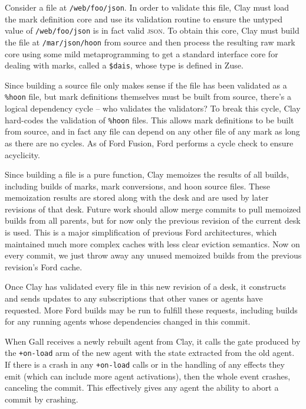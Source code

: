 \documentclass[twoside]{article}
\begin{document}
Consider a file at \lstinline[style=inlinecode]{/web/foo/json}. In order to validate this file, Clay must load the mark definition core and use its validation routine to ensure the untyped value of \lstinline[style=inlinecode]{/web/foo/json} is in fact valid \textsc{json}. To obtain this core, Clay must build the file at \lstinline[style=inlinecode]{/mar/json/hoon} from source and then process the resulting raw mark core using some mild metaprogramming to get a standard interface core for dealing with marks, called a \lstinline[style=inlinecode]{$dais}, whose type is defined in Zuse.

Since building a source file only makes sense if the file has been validated as a \lstinline[style=inlinecode]{%hoon} file, but mark definitions themselves must be built from source, there's a logical dependency cycle – who validates the validators? To break this cycle, Clay hard-codes the validation of \lstinline[style=inlinecode]{%hoon} files. This allows mark definitions to be built from source, and in fact any file can depend on any other file of any mark as long as there are no cycles. As of Ford Fusion, Ford performs a cycle check to ensure acyclicity.

Since building a file is a pure function, Clay memoizes the results of all builds, including builds of marks, mark conversions, and hoon source files. These memoization results are stored along with the desk and are used by later revisions of that desk. Future work should allow merge commits to pull memoized builds from all parents, but for now only the previous revision of the current desk is used. This is a major simplification of previous Ford architectures, which maintained much more complex caches with less clear eviction semantics. Now on every commit, we just throw away any unused memoized builds from the previous revision's Ford cache.

Once Clay has validated every file in this new revision of a desk, it constructs and sends updates to any subscriptions that other vanes or agents have requested. More Ford builds may be run to fulfill these requests, including builds for any running agents whose dependencies changed in this commit.

When Gall receives a newly rebuilt agent from Clay, it calls the gate produced by the \lstinline[style=inlinecode]{+on-load} arm of the new agent with the state extracted from the old agent. If there is a crash in any \lstinline[style=inlinecode]{+on-load} calls or in the handling of any effects they emit (which can include more agent activations), then the whole event crashes, canceling the commit. This effectively gives any agent the ability to abort a commit by crashing.
\end{document}
